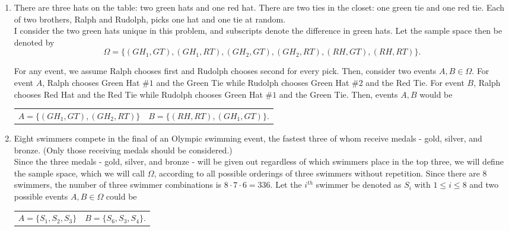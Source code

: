 \documentclass[12pt]{article}
\begin{document}
\begin{center}
\begin{enumerate}[label=(\alph*)]
\item There are three hats on the table: two green hats and one red hat.
There are two ties in the closet: one green tie and one red tie. Each of
two brothers, Ralph and Rudolph, picks one hat and one tie at random.\\
\vspace{0.3cm}
I consider the two green hats unique in this problem, and subscripts denote the difference in green hats. Let the sample space then be denoted by
\begin{equation*}
\Omega=\big \{  (GH_1, GT), (GH_1, RT), (GH_2, GT), (GH_2, RT), (RH, GT), (RH, RT)  \big \} .
\end{equation*}

\noindent
For any event, we assume Ralph chooses first and Rudolph chooses second for every pick. Then, consider two events $A,B \in \Omega$. For event $A$, Ralph chooses Green Hat $\#1$ and the Green Tie while Rudolph chooses Green Hat $\#2$ and the Red Tie. For event $B$, Ralph chooses Red Hat and the Red Tie while Rudolph chooses Green Hat $\#1$ and the Green Tie. Then, events $A,B$ would be 

\begin{center}
\begin{tabular}{c c}
$A=\big \{ (GH_1, GT), (GH_2, RT) \big \}$ & $B=\big \{  (RH, RT), (GH_1, GT) \big \}$.\\
\end{tabular}
\end{center}

\item Eight swimmers compete in the final of an Olympic swimming event,
the fastest three of whom receive medals - gold, silver, and bronze. (Only
those receiving medals should be considered.)\\
\vspace{0.3cm}
Since the three medals - gold, silver, and bronze - will be given out regardless of which swimmers place in the top three, we will define the sample space, which we will call $\Omega$, according to all possible orderings of three swimmers without repetition. Since there are $8$ swimmers, the number of three swimmer combinations is $8 \cdot 7 \cdot 6=336$. Let the $i^{th}$ swimmer be denoted as $S_i$ with $1 \leq i \leq 8$ and two possible events $A,B \in \Omega$ could be

\begin{center}
\begin{tabular}{c c}
$A=\big \{ S_1, S_2, S_3 \}$ & $B=\big \{  S_6, S_3, S_4 \big \}$.\\
\end{tabular}
\end{center}


\end{enumerate}
\end{center}
\end{document}
